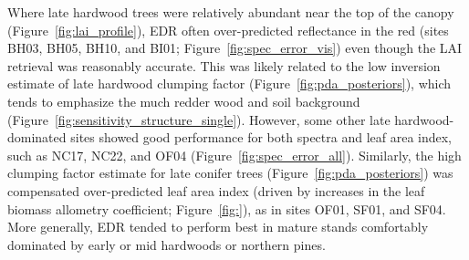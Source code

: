 Where late hardwood trees were relatively abundant near the top of the canopy (Figure~\ref{fig:lai_profile}), EDR often over-predicted reflectance in the red (sites BH03, BH05, BH10, and BI01; Figure~\ref{fig:spec_error_vis}) even though the LAI retrieval was reasonably accurate.
This was likely related to the low inversion estimate of late hardwood clumping factor (Figure~\ref{fig:pda_posteriors}), which tends to emphasize the much redder wood and soil background (Figure~\ref{fig:sensitivity_structure_single}).
However, some other late hardwood-dominated sites showed good performance for both spectra and leaf area index, such as NC17, NC22, and OF04 (Figure~\ref{fig:spec_error_all}).
Similarly, the high clumping factor estimate for late conifer trees (Figure~\ref{fig:pda_posteriors}) was compensated over-predicted leaf area index (driven by increases in the leaf biomass allometry coefficient; Figure~\ref{fig:}), as in sites OF01, SF01, and SF04.
More generally, EDR tended to perform best in mature stands comfortably dominated by early or mid hardwoods or northern pines.
